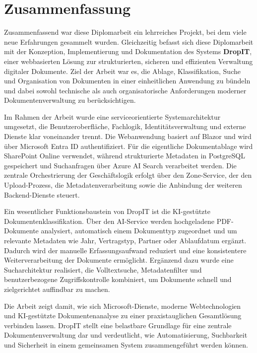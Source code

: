 \section{Zusammenfassung}
Zusammenfassend war diese Diplomarbeit ein lehrreiches Projekt, bei dem viele neue
Erfahrungen gesammelt wurden. Gleichzeitig befasst sich diese Diplomarbeit mit der Konzeption,
Implementierung und Dokumentation des Systems \textbf{DropIT}, einer webbasierten
Lösung zur strukturierten, sicheren und effizienten Verwaltung digitaler
Dokumente. Ziel der Arbeit war es, die Ablage, Klassifikation, Suche und
Organisation von Dokumenten in einer einheitlichen Anwendung zu bündeln und
dabei sowohl technische als auch organisatorische Anforderungen moderner
Dokumentenverwaltung zu berücksichtigen.

Im Rahmen der Arbeit wurde eine serviceorientierte Systemarchitektur umgesetzt,
die Benutzeroberfläche, Fachlogik, Identitätsverwaltung und externe Dienste
klar voneinander trennt. Die Webanwendung basiert auf Blazor und wird über
Microsoft Entra ID authentifiziert. Für die eigentliche Dokumentablage wird
SharePoint Online verwendet, während strukturierte Metadaten in PostgreSQL
gespeichert und Suchanfragen über Azure AI Search verarbeitet werden. Die
zentrale Orchestrierung der Geschäftslogik erfolgt über den Zone-Service, der
den Upload-Prozess, die Metadatenverarbeitung sowie die Anbindung der weiteren
Backend-Dienste steuert.

Ein wesentlicher Funktionsbaustein von DropIT ist die KI-gestützte
Dokumentenklassifikation. Über den AI-Service werden hochgeladene PDF-Dokumente
analysiert, automatisch einem Dokumenttyp zugeordnet und um relevante Metadaten
wie Jahr, Vertragstyp, Partner oder Ablaufdatum ergänzt. Dadurch wird der
manuelle Erfassungsaufwand reduziert und eine konsistentere Weiterverarbeitung
der Dokumente ermöglicht. Ergänzend dazu wurde eine Sucharchitektur realisiert,
die Volltextsuche, Metadatenfilter und benutzerbezogene Zugriffskontrolle
kombiniert, um Dokumente schnell und zielgerichtet auffindbar zu machen.

Die Arbeit zeigt damit, wie sich Microsoft-Dienste, moderne Webtechnologien und
KI-gestützte Dokumentenanalyse zu einer praxistauglichen Gesamtlösung verbinden
lassen. DropIT stellt eine belastbare Grundlage für eine zentrale
Dokumentenverwaltung dar und verdeutlicht, wie Automatisierung, Suchbarkeit und
Sicherheit in einem gemeinsamen System zusammengeführt werden können.

